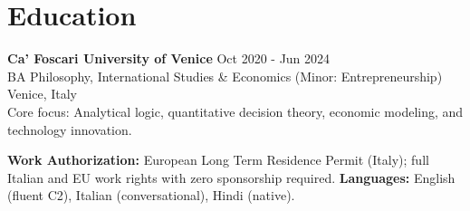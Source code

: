 \documentclass[a4paper,10pt]{article}
\begin{document}
\section{Education}
\textbf{Ca' Foscari University of Venice} \hfill Oct 2020 - Jun 2024\\
BA Philosophy, International Studies \& Economics (Minor: Entrepreneurship) \hfill Venice, Italy\\
{\footnotesize Core focus: Analytical logic, quantitative decision theory, economic modeling, and technology innovation.}

\vspace{2pt}
{\small \textbf{Work Authorization:} European Long Term Residence Permit (Italy); full Italian and EU work rights with zero sponsorship required. \quad \textbf{Languages:} English (fluent C2), Italian (conversational), Hindi (native).}
\end{document}
